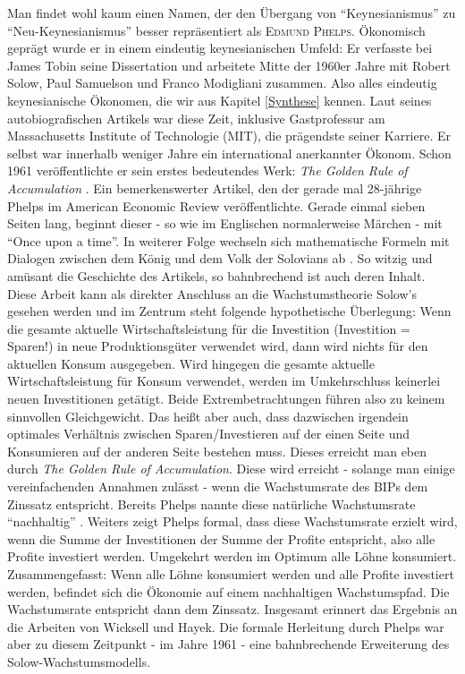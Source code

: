 Man findet wohl kaum einen Namen, der den Übergang von "`Keynesianismus"' zu "`Neu-Keynesianismus"' besser repräsentiert als \textsc{Edmund Phelps}. Ökonomisch geprägt wurde er in einem eindeutig keynesianischen Umfeld: Er verfasste bei James Tobin seine Dissertation und arbeitete Mitte der 1960er Jahre mit Robert Solow, Paul Samuelson und Franco Modigliani zusammen. Also alles eindeutig keynesianische Ökonomen, die wir aus Kapitel \ref{Synthese} kennen. Laut seines autobiografischen Artikels \textcite[S. 93]{Heertje1995} war diese Zeit, inklusive Gastprofessur am Massachusetts Institute of Technologie (MIT), die prägendste seiner Karriere. Er selbst war innerhalb weniger Jahre ein international anerkannter Ökonom. Schon 1961 veröffentlichte er sein erstes bedeutendes Werk: \textit{The Golden Rule of Accumulation} \parencite{Phelps1961}. Ein bemerkenswerter Artikel, den der gerade mal 28-jährige Phelps im American Economic Review veröffentlichte. Gerade einmal sieben Seiten lang, beginnt dieser - so wie im Englischen normalerweise Märchen  - mit "`Once upon a time"'. In weiterer Folge wechseln sich mathematische Formeln mit Dialogen zwischen dem König und dem Volk der Solovians ab \parencite[S. 640]{Phelps1961}. So witzig und amüsant die Geschichte des Artikels, so bahnbrechend ist auch deren Inhalt. Diese Arbeit kann als direkter Anschluss an die Wachstumstheorie Solow's gesehen werden und im Zentrum steht folgende hypothetische Überlegung: Wenn die gesamte aktuelle Wirtschaftsleistung für die Investition (Investition = Sparen!) in neue Produktionsgüter verwendet wird, dann wird nichts für den aktuellen Konsum ausgegeben. Wird hingegen die gesamte aktuelle Wirtschaftsleistung für Konsum verwendet, werden im Umkehrschluss keinerlei neuen Investitionen getätigt. Beide Extrembetrachtungen führen also zu keinem sinnvollen Gleichgewicht. Das heißt aber auch, dass dazwischen irgendein optimales Verhältnis zwischen Sparen/Investieren auf der einen Seite und Konsumieren auf der anderen Seite bestehen muss. Dieses erreicht man eben durch \textit{The Golden Rule of Accumulation}. Diese wird erreicht - solange man einige vereinfachenden Annahmen zulässt - wenn die Wachstumsrate des BIPs dem Zinssatz entspricht. Bereits Phelps nannte diese natürliche Wachstumsrate "`nachhaltig"' \parencite[S. 638]{Phelps1961}. Weiters zeigt Phelps formal, dass diese Wachstumsrate erzielt wird, wenn die Summe der Investitionen der Summe der Profite entspricht, also alle Profite investiert werden. Umgekehrt werden im Optimum alle Löhne konsumiert. Zusammengefasst: Wenn alle Löhne konsumiert werden und alle Profite investiert werden, befindet sich die Ökonomie auf einem nachhaltigen Wachstumspfad. Die Wachstumsrate entspricht dann dem Zinssatz. Insgesamt erinnert das Ergebnis an die Arbeiten von Wicksell und Hayek. Die formale Herleitung durch Phelps war aber zu diesem Zeitpunkt - im Jahre 1961 - eine bahnbrechende Erweiterung des Solow-Wachstumsmodells.

